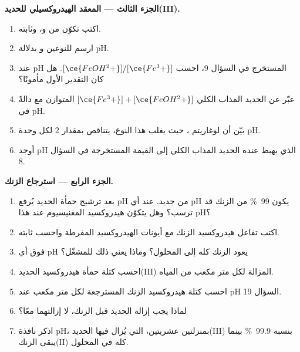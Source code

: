 \begin{problem}
\medskip
\noindent\textbf{الجزء الثالث --- المعقد الهيدروكسيلي للحديد(III).}
\begin{enumerate}[resume]
  \item اكتب تكوّن  من  و،
        وثابته.
  \item ارسم  للنوعين  و
        بدلالة pH.
  \item عند pH المستخرج في السؤال 9، احسب
        $[\ce{FeOH^2+}]/[\ce{Fe^3+}]$. هل كان التقدير الأول مأمونًا؟
  \item عبّر عن الحديد المذاب الكلي $[\ce{Fe^3+}] + [\ce{FeOH^2+}]$
        المتوازن مع  دالةً في pH.
  \item بيّن أن لوغاريتم ، حيث يغلب هذا النوع،
        يتناقص بمقدار 2 لكل وحدة pH.
  \item أوجد pH الذي يهبط عنده الحديد المذاب الكلي إلى القيمة
        المستخرجة في السؤال 8.
\end{enumerate}

\medskip
\noindent\textbf{الجزء الرابع --- استرجاع الزنك.}
\begin{enumerate}[resume]
  \item بعد ترشيح حمأة الحديد يُرفع pH من جديد. عند
        أي pH يكون \qty{99}{\percent} من الزنك قد ترسب؟ وهل يتكوّن هيدروكسيد
        المغنيسيوم عند هذا pH؟
  \item اكتب تفاعل هيدروكسيد الزنك مع أيونات الهيدروكسيد المفرطة
        واحسب ثابته.
  \item فوق أي pH يعود الزنك كله إلى المحلول؟ وماذا يعني
        ذلك للمشغّل؟
  \item احسب كتلة حمأة هيدروكسيد الحديد(III) المزالة لكل متر
        مكعب من المياه.
  \item احسب كتلة هيدروكسيد الزنك المسترجعة لكل متر مكعب عند
        pH السؤال 19.
  \item لماذا يجب إزالة الحديد قبل الزنك، لا إزالتهما
        معًا؟
  \item اذكر نافذة pH، بمنزلتين عشريتين، التي يُزال فيها الحديد(III)
        بنسبة \qty{99.9}{\percent} بينما يبقى الزنك(II) كله في
        المحلول.
\end{enumerate}
\end{problem}
